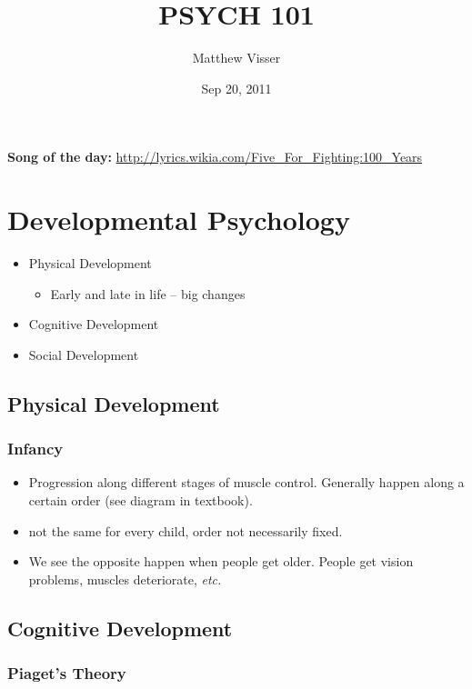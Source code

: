 \documentclass[12pt]{article}
\begin{document}
\title{PSYCH 101}
\author{Matthew Visser}
\date{Sep 20, 2011}
\maketitle

\textbf{Song of the day:}
\url{http://lyrics.wikia.com/Five_For_Fighting:100_Years}

\section{Developmental Psychology}

\begin{itemize}
    \item Physical Development
        \begin{itemize}
            \item Early and late in life -- big changes
        \end{itemize}
    \item Cognitive Development
    \item Social Development
\end{itemize}

\subsection{Physical Development}

\subsubsection{Infancy}

\begin{itemize}
    \item Progression along different stages of muscle control. Generally happen
        along a certain order (see diagram in textbook).
    \item not the same for every child, order not necessarily fixed.
    \item We see the opposite happen when people get older. People get vision
        problems, muscles deteriorate, \textit{etc.}
\end{itemize}

\subsection{Cognitive Development}

\subsubsection{Piaget's Theory}
\end{document}
